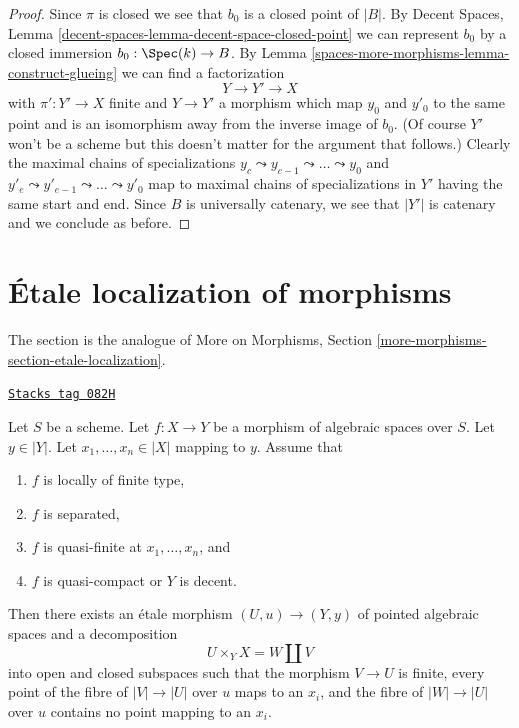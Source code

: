 \begin{proof}
\medskip\noindent
Since $\pi$ is closed we see that $b_0$ is a closed point of $|B|$.
By Decent Spaces, Lemma \ref{decent-spaces-lemma-decent-space-closed-point}
we can represent $b_0$ by a closed immersion $b_0 : \Spec(k) \to B$.
By Lemma \ref{spaces-more-morphisms-lemma-construct-glueing}
we can find a factorization
$$
Y \to Y' \to X
$$
with $\pi' : Y' \to X$ finite and $Y \to Y'$ a morphism which
map $y_0$ and $y'_0$ to the same point and is an isomorphism
away from the inverse image of $b_0$.
(Of course $Y'$ won't be a scheme but this doesn't matter for the
argument that follows.)
Clearly the maximal chains of specializations
$y_c \leadsto y_{c - 1} \leadsto \ldots \leadsto y_0$ and
$y'_e \leadsto y'_{e - 1} \leadsto \ldots \leadsto y'_0$
map to maximal chains of specializations in $Y'$ having
the same start and end.
Since $B$ is universally catenary, we see that
$|Y'|$ is catenary and we conclude as before.
\end{proof}

\section{\'Etale localization of morphisms}
\label{spaces-more-morphisms-section-etale-localization}
The section is the analogue of
More on Morphisms, Section \ref{more-morphisms-section-etale-localization}.

\begin{lemma}
\label{spaces-more-morphisms-lemma-etale-splits-off-quasi-finite-part}
\href{https://stacks.math.columbia.edu/tag/082H}{\texttt{Stacks tag 082H}}

Let $S$ be a scheme.
Let $f : X \to Y$ be a morphism of algebraic spaces over $S$.
Let $y \in |Y|$. Let $x_1, \ldots, x_n \in |X|$ mapping to $y$.
Assume that
\begin{enumerate}
\item $f$ is locally of finite type,
\item $f$ is separated,
\item $f$ is quasi-finite at $x_1, \ldots, x_n$, and
\item $f$ is quasi-compact or $Y$ is decent.
\end{enumerate}
Then there exists an \'etale morphism $(U, u) \to (Y, y)$
of pointed algebraic spaces and a decomposition
$$
U \times_Y X = W \amalg V
$$
into open and closed subspaces such that the morphism $V \to U$ is finite,
every point of the fibre of $|V| \to |U|$ over $u$ maps to an $x_i$,
and the fibre of $|W| \to |U|$ over $u$ contains no point mapping to an
$x_i$.
\end{lemma}

